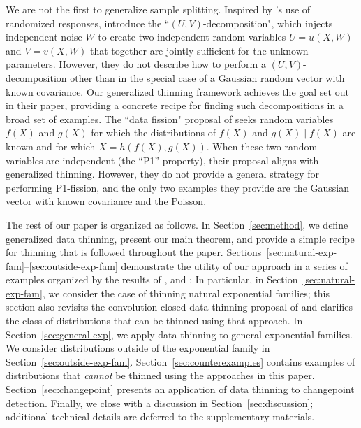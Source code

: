 \documentclass[12pt]{article}
\begin{document}
We are not the first to generalize sample splitting.  Inspired by \cite{tian2018selective}'s use of randomized responses, \cite{rasines2021splitting} introduce the ``$(U,V)$-decomposition", which injects independent noise $W$ to create two independent random variables $U=u(X,W)$ and $V=v(X,W)$ that together are jointly sufficient for the unknown parameters.  However, they do not describe how to perform a $(U,V)$-decomposition other than in the special case of a Gaussian random vector with known covariance.  Our generalized thinning framework achieves the goal set out in their paper, providing a concrete recipe for finding such decompositions in a broad set of examples.  The ``data fission" proposal of \cite{leiner2022data} seeks random variables $f(X)$ and $g(X)$ for which the distributions of $f(X)$ and $g(X) \mid f(X)$ are known and for which $X=h(f(X),g(X))$. When these two random variables are independent (the ``P1'' property), their proposal aligns with generalized thinning.  However, they do not provide a general strategy for performing P1-fission, and the only two examples they provide are the Gaussian vector with known covariance and the Poisson.

The rest of our paper is organized as follows. In Section~\ref{sec:method}, we define generalized data thinning, present our main theorem, and provide a simple recipe for thinning that is followed throughout the paper. Sections~\ref{sec:natural-exp-fam}--\ref{sec:outside-exp-fam} demonstrate the utility of our approach in a series of examples organized by the results of \cite{darmois, koopman}, and \cite{pitman_1936}: In particular, in Section~\ref{sec:natural-exp-fam}, we consider the case of thinning natural exponential families; this section also revisits the convolution-closed data thinning proposal of \cite{neufeld2023data} and clarifies the class of distributions that can be thinned using that approach. In Section~\ref{sec:general-exp}, we apply data thinning to  general exponential families. We consider distributions outside of the exponential family in Section~\ref{sec:outside-exp-fam}. Section~\ref{sec:counterexamples} contains examples of distributions that \emph{cannot} be thinned using the approaches in this paper.  
Section~\ref{sec:changepoint} presents an application of data thinning to changepoint detection.  
Finally, we close with a discussion in Section~\ref{sec:discussion}; additional technical details are deferred to the supplementary materials.  
\end{document}
